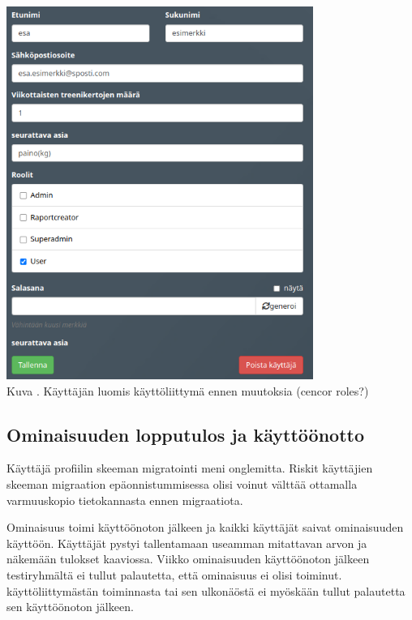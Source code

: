 \bigskip


\includegraphics[width = 10cm]{src/public/oppar/adminUserProfilePre.png}\\
Kuva \getImgCount {}. Käyttäjän luomis käyttöliittymä ennen muutoksia (cencor roles?)
\medskip

\fi









\subsection{Ominaisuuden lopputulos ja käyttöönotto}



Käyttäjä profiilin skeeman migratointi meni onglemitta.
Riskit käyttäjien skeeman migraation epäonnistummisessa olisi voinut välttää ottamalla varmuuskopio tietokannasta ennen migraatiota.
\medskip

Ominaisuus toimi käyttöönoton jälkeen ja kaikki käyttäjät saivat ominaisuuden käyttöön.
Käyttäjät pystyi tallentamaan useamman mitattavan arvon ja näkemään tulokset kaaviossa.
Viikko ominaisuuden käyttöönoton jälkeen testiryhmältä ei tullut palautetta, että ominaisuus ei olisi toiminut.
käyttöliittymästän toiminnasta tai sen ulkonäöstä ei myöskään tullut palautetta sen käyttöönoton jälkeen.
\medskip

